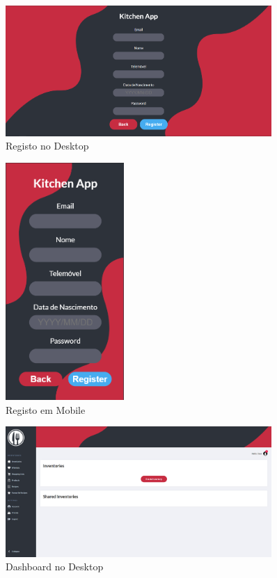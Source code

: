 \documentclass[a4paper]{report}
\begin{document}
    \begin{figure}[H]
    \centering
            \includegraphics[width=0.9\textwidth]{images/mockup/register_desktop.png}
            \caption{Registo no Desktop}
    \end{figure}
    \begin{figure}[H]
    \centering
            \includegraphics[width=0.4\textwidth]{images/mockup/register_mobile.png}
            \caption{Registo em Mobile}
    \end{figure}
    \begin{figure}[H]
    \centering
            \includegraphics[width=0.9\textwidth]{images/mockup/dashboard_desktop.png}
            \caption{Dashboard no Desktop}
    \end{figure}
\end{document}
